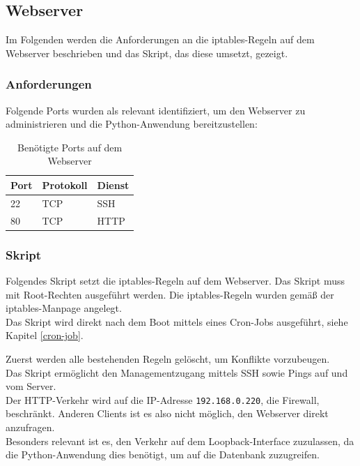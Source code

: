 \documentclass[
    a4paper,
    pagesize,
	pdftex,
    12pt,
]{scrartcl}
\begin{document}
\subsection{Webserver}\label{config-firewall-ws}
Im Folgenden werden die Anforderungen an die iptables-Regeln auf dem Webserver beschrieben und das Skript, das diese umsetzt, gezeigt.

\subsubsection{Anforderungen}
Folgende Ports wurden als relevant identifiziert, um den Webserver zu administrieren und die Python-Anwendung bereitzustellen:
\begin{table}[h!]
	\begin{center}
		\label{tab:table4}
		\begin{tabular}{l|l |l }
			\textbf{Port} & \textbf{Protokoll} & \textbf{Dienst} \\
			\hline
			22 & TCP & SSH \\
			80 & TCP & HTTP \\
		\end{tabular}
		\caption{Benötigte Ports auf dem Webserver}
	\end{center}
\end{table}

\subsubsection{Skript}
Folgendes Skript setzt die iptables-Regeln auf dem Webserver. Das Skript muss mit Root-Rechten ausgeführt werden.
Die iptables-Regeln wurden gemäß der iptables-Manpage \cite{iptables-manpage} angelegt. \\
Das Skript wird direkt nach dem Boot mittels eines Cron-Jobs ausgeführt, siehe Kapitel \ref{cron-job}.

Zuerst werden  alle bestehenden Regeln gelöscht, um Konflikte vorzubeugen. \\
Das Skript ermöglicht den Managementzugang mittels SSH sowie Pings auf und vom Server. \\
Der HTTP-Verkehr wird auf die IP-Adresse \lstinline[breaklines]|192.168.0.220|, die Firewall, beschränkt. Anderen Clients ist es also nicht möglich, den Webserver direkt anzufragen. \\
Besonders relevant ist es, den Verkehr auf dem Loopback-Interface zuzulassen, da die Python-Anwendung dies benötigt, um auf die Datenbank zuzugreifen.
\end{document}
